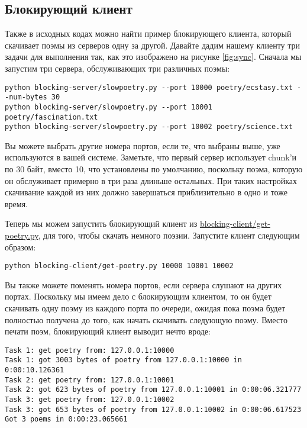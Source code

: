 \subsection{Блокирующий клиент}


    Также в исходных кодах можно найти пример блокирующего 
клиента, который скачивает поэмы из серверов одну за 
другой. Давайте дадим нашему клиенту три задачи для 
выполнения так, как это изображено на рисунке \ref{fig:sync}. 
Сначала мы запустим три сервера, обслуживающих три 
различных поэмы:

\begin{verbatim}
python blocking-server/slowpoetry.py --port 10000 poetry/ecstasy.txt --num-bytes 30
python blocking-server/slowpoetry.py --port 10001 poetry/fascination.txt
python blocking-server/slowpoetry.py --port 10002 poetry/science.txt
\end{verbatim}


Вы можете выбрать другие номера портов, если те, 
что выбраны выше, уже используются в вашей системе. 
Заметьте, что первый сервер использует chunk'и по 
30 байт, вместо 10, что установлены по умолчанию, 
поскольку поэма, которую он обслуживает  примерно 
в три раза длиньше остальных. При таких настройках 
скачивание каждой из них должно завершаться 
приблизительно в одно и тоже время.


Теперь мы можем запустить блокирующий клиент из 
\href{http://github.com/jdavisp3/twisted-intro/blob/master/blocking-client/get-poetry.py}{blocking-client/get-poetry.py}, 
для того, чтобы скачать немного поэзии. Запустите клиент следующим образом:

\begin{verbatim}
python blocking-client/get-poetry.py 10000 10001 10002
\end{verbatim}


Вы также можете поменять номера портов, если сервера 
слушают на других портах. Поскольку мы имеем дело с 
блокирующим клиентом, то он будет скачивать одну поэму 
из каждого порта по очереди, ожидая пока поэма будет 
полностью получена до того, как начать скачивать 
следующую поэму. Вместо печати поэм, блокирующий клиент 
выводит нечто вроде: 

\begin{verbatim}
Task 1: get poetry from: 127.0.0.1:10000
Task 1: got 3003 bytes of poetry from 127.0.0.1:10000 in 0:00:10.126361
Task 2: get poetry from: 127.0.0.1:10001
Task 2: got 623 bytes of poetry from 127.0.0.1:10001 in 0:00:06.321777
Task 3: get poetry from: 127.0.0.1:10002
Task 3: got 653 bytes of poetry from 127.0.0.1:10002 in 0:00:06.617523
Got 3 poems in 0:00:23.065661
\end{verbatim}

